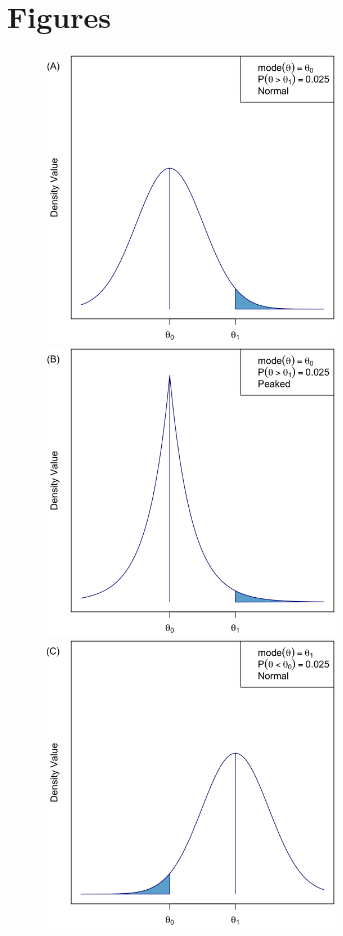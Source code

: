 \documentclass[12pt]{article}
\begin{document}
\section*{Figures}
\begin{figure}[htbp]
\begin{center}
\includegraphics[width=3in]{./figures/figure1a.png}
\includegraphics[width=3in]{./figures/figure1b.png}
\includegraphics[width=3in]{./figures/figure1c.png}

\end{center}
\end{figure}
\end{document}
